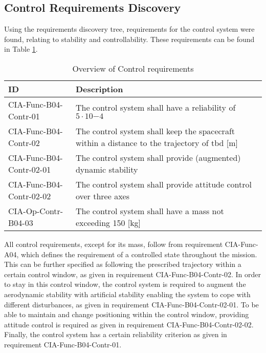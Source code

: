 \subsection{Control Requirements Discovery} \label{sec:req-control}
Using the requirements discovery tree, requirements for the control system were found, relating to stability and controllability. These requirements can be found in Table \ref{tab:controlreq}.

\begin{table}[H]
	\caption{Overview of Control requirements}	
	\begin{tabular}{|p{}|p{}|}
		\hline
		ID         					&	Description																							\\ \hline \hline
		CIA-Func-B04-Contr-01		&	The control system shall have a reliability of $5 \cdot 10 {-4}$            									\\ \hline
		CIA-Func-B04-Contr-02 		&	The control system shall keep the spacecraft within a distance to the trajectory of \gls{tbd} [m]	\\ \hline	
		CIA-Func-B04-Contr-02-01 	&	The control system shall provide (augmented) dynamic stability       								\\ \hline
		CIA-Func-B04-Contr-02-02 	&	The control system shall provide attitude control over three axes         							\\ \hline	
		CIA-Op-Contr-B04-03	&	The control system shall have a mass not exceeding 150 [kg]  							\\ \hline
	\end{tabular}
\label{tab:controlreq}
\end{table}

All control requirements, except for its mass, follow from requirement CIA-Func-A04, which defines the requirement of a controlled state throughout the mission. 
This can be further specified as following the prescribed trajectory within a certain control window, as given in requirement CIA-Func-B04-Contr-02. 
In order to stay in this control window, the control system is required to augment the aerodynamic stability with artificial stability enabling the system to cope with different disturbances, as given in requirement CIA-Func-B04-Contr-02-01. 
To be able to maintain and change positioning within the control window, providing attitude control is required as given in requirement CIA-Func-B04-Contr-02-02. 
Finally, the control system has a certain reliability criterion as given in requirement CIA-Func-B04-Contr-01.